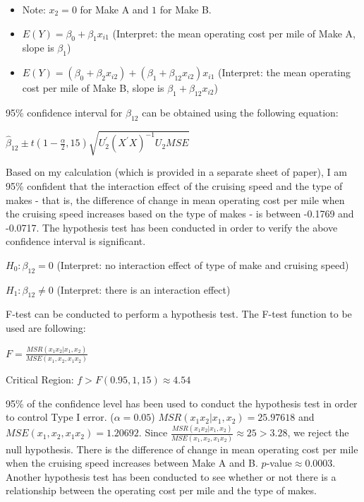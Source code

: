 \documentclass[letterpaper]{article}
\begin{document}
\begin{itemize}
\item Note: $x_2 = 0$ for Make A and $1$ for Make B.
\item $E(Y) = \beta_0 + \beta_1x_{i1}$ (Interpret: the mean operating cost per mile of Make A, slope is $\beta_1$)
\item $E(Y) = (\beta_0 + \beta_2x_{i2}) + (\beta_1 + \beta_{12}x_{i2})x_{i1}$ (Interpret: the mean operating cost per mile of Make B, slope is $\beta_1 + \beta_{12}x_{i2}$)
\end{itemize}

\begin{flushleft}
95\% confidence interval for $\beta_{12}$ can be obtained using the following equation:
\end{flushleft}

\begin{center}
$\hat{\beta}_{12} \pm t(1-\frac{\alpha}{2}, 15) \sqrt{U^\prime_2(X^\prime X)^{-1}U_2MSE}$
\end{center}

\begin{flushleft}
Based on my calculation (which is provided in a separate sheet of paper), I am 95\% confident that the interaction effect of the cruising speed and the type of makes - that is, the difference of change in mean operating cost per mile when the cruising speed increases based on the type of makes - is between -0.1769 and -0.0717. The hypothesis test has been conducted in order to verify the above confidence interval is significant.
\end{flushleft}

\begin{center}
$H_0: \beta_{12} = 0$ (Interpret: no interaction effect of type of make and cruising speed)

$H_1: \beta_{12} \neq 0$ (Interpret: there is an interaction effect)
\end{center}

\begin{flushleft}
F-test can be conducted to perform a hypothesis test. The F-test function to be used are following:
\end{flushleft}

\begin{center}
$F = \frac{MSR(x_1x_2|x_1,x_2)}{MSE(x_1,x_2,x_1x_2)}$

Critical Region: $f > F(0.95, 1, 15) \approx 4.54$
\end{center}

\begin{flushleft}
95\% of the confidence level has been used to conduct the hypothesis test in order to control Type I error. ($\alpha = 0.05$) $MSR(x_1x_2|x_1,x_2) = 25.97618$ and $MSE(x_1,x_2,x_1x_2) = 1.20692$. Since $\frac{MSR(x_1x_2|x_1,x_2)}{MSE(x_1,x_2,x_1x_2)} \approx 25 > 3.28$, we reject the null hypothesis. There is the difference of change in mean operating cost per mile when the cruising speed increases between Make A and B. $p$-value$ \approx 0.0003$. Another hypothesis test has been conducted to see whether or not there is a relationship between the operating cost per mile and the type of makes.
\end{flushleft}
\end{document}
